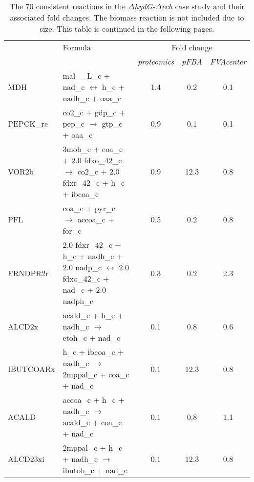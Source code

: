 \small
\begin{longtable}{lp{}ccc}
\caption[Consistent reactions between flux simulations and proteomic data]{The 70 consistent reactions in the \textit{$\Delta$hydG-$\Delta$ech} case study and their associated fold changes. The biomass reaction is not included due to size. This table is continued in the following pages.} \\
\toprule
\rowcolor{white} \multirow{1}{*}{ID} & \multirow{1}{*}{Formula}  & \multicolumn{3}{c}{Fold change} \\
\rowcolor{white} & & \emph{proteomics} & \emph{pFBA} & \emph{FVAcenter} \\
\midrule
MDH	&	mal\_\_L\_c + nad\_c $\leftrightarrow$ h\_c + nadh\_c + oaa\_c	&	1.4	&	0.2	&	0.1	\\
PEPCK\_re	&	co2\_c + gdp\_c + pep\_c $\rightarrow$ gtp\_c + oaa\_c	&	0.9	&	0.1	&	0.1	\\
VOR2b	&	3mob\_c + coa\_c + 2.0 fdxo\_42\_c $\rightarrow$ co2\_c + 2.0 fdxr\_42\_c + h\_c + ibcoa\_c	&	0.9	&	12.3	&	0.8	\\
PFL	&	coa\_c + pyr\_c $\rightarrow$ accoa\_c + for\_c	&	0.5	&	0.2	&	0.8	\\
FRNDPR2r	&	2.0 fdxr\_42\_c + h\_c + nadh\_c + 2.0 nadp\_c $\leftrightarrow$ 2.0 fdxo\_42\_c + nad\_c + 2.0 nadph\_c	&	0.3	&	0.2	&	2.3	\\
ALCD2x	&	acald\_c + h\_c + nadh\_c $\rightarrow$ etoh\_c + nad\_c	&	0.1	&	0.8	&	0.6	\\
IBUTCOARx	&	h\_c + ibcoa\_c + nadh\_c $\rightarrow$ 2mppal\_c + coa\_c + nad\_c	&	0.1	&	12.3	&	0.8	\\
ACALD	&	accoa\_c + h\_c + nadh\_c $\rightarrow$ acald\_c + coa\_c + nad\_c	&	0.1	&	0.8	&	1.1	\\
ALCD23xi	&	2mppal\_c + h\_c + nadh\_c $\rightarrow$ ibutoh\_c + nad\_c	&	0.1	&	12.3	&	0.8	\\

\end{longtable}

